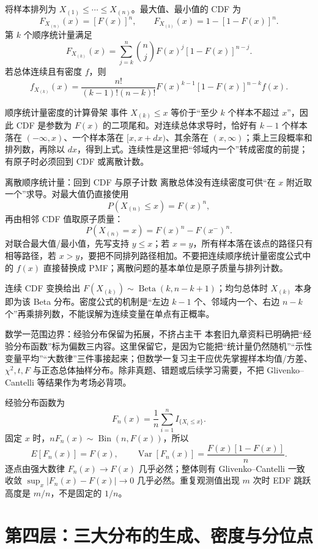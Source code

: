 \documentclass[11pt,a4paper]{ctexart}
\begin{document}
将样本排列为 $X_{(1)}\le\cdots\le X_{(n)}$。最大值、最小值的 CDF 为
\[
F_{X_{(n)}}(x)=[F(x)]^n,\qquad F_{X_{(1)}}(x)=1-[1-F(x)]^n.
\]
第 $k$ 个顺序统计量满足
\[
F_{X_{(k)}}(x)=\sum_{j=k}^n\binom njF(x)^j[1-F(x)]^{n-j}.
\]
若总体连续且有密度 $f$，则
\[
f_{X_{(k)}}(x)=\frac{n!}{(k-1)!(n-k)!}F(x)^{k-1}[1-F(x)]^{n-k}f(x).
\]
\begin{methodbox}{顺序统计量密度的计算骨架}
事件 $X_{(k)}\le x$ 等价于“至少 $k$ 个样本不超过 $x$”，因此 CDF 是参数为 $F(x)$ 的二项尾和。对连续总体求导时，恰好有 $k-1$ 个样本落在 $(-\infty,x)$、一个样本落在 $[x,x+dx)$、其余落在 $(x,\infty)$；乘上三段概率和排列数，再除以 $dx$，得到上式。连续性是这里把“邻域内一个”转成密度的前提；有原子时必须回到 CDF 或离散计数。
\end{methodbox}
\begin{methodbox}{离散顺序统计量：回到 CDF 与原子计数}
离散总体没有连续密度可供“在 $x$ 附近取一个”求导。对最大值仍直接使用
\[
P(X_{(n)}\le x)=F(x)^n,
\]
再由相邻 CDF 值取原子质量：
\[
P(X_{(n)}=x)=F(x)^n-F(x^-)^n.
\]
对联合最大值/最小值，先写支持 $y\le x$；若 $x=y$，所有样本落在该点的路径只有相等路径，若 $x>y$，要把不同排列路径相加。不要把连续顺序统计量密度公式中的 $f(x)$ 直接替换成 PMF；离散问题的基本单位是原子质量与排列计数。
\end{methodbox}
连续 CDF 变换给出 $F(X_{(k)})\sim\operatorname{Beta}(k,n-k+1)$；均匀总体时 $X_{(k)}$ 本身即为该 Beta 分布。密度公式的机制是“左边 $k-1$ 个、邻域内一个、右边 $n-k$ 个”再乘排列数，不能误解为连续变量在单点有正概率。

\begin{warnbox}{数学一范围边界：经验分布保留为拓展，不挤占主干}
本套旧九章资料已明确把“经验分布函数”标为偏数三内容。这里保留它，是因为它能把“统计量仍然随机”“示性变量平均”“大数律”三件事接起来；但数学一复习主干应优先掌握样本均值/方差、$\chi^2,t,F$ 与正态总体抽样分布。除非真题、错题或后续学习需要，不把 Glivenko--Cantelli 等结果作为考场必背项。
\end{warnbox}

经验分布函数为
\[
F_n(x)=\frac1n\sum_{i=1}^nI_{\{X_i\le x\}}.
\]
固定 $x$ 时，$nF_n(x)\sim\operatorname{Bin}(n,F(x))$，所以
\[
E[F_n(x)]=F(x),\qquad \operatorname{Var}[F_n(x)]=\frac{F(x)[1-F(x)]}{n}.
\]
逐点由强大数律 $F_n(x)\to F(x)$ 几乎必然；整体则有 Glivenko--Cantelli 一致收敛 $\sup_x\lvert F_n(x)-F(x)\rvert\to0$ 几乎必然。重复观测值出现 $m$ 次时 EDF 跳跃高度是 $m/n$，不是固定的 $1/n$。

\section{第四层：三大分布的生成、密度与分位点}
\end{document}
